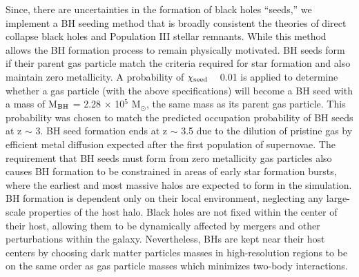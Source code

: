 \documentclass[manuscript]{aastex}
\begin{document}
Since, there are uncertainties in the formation of black holes ``seeds,'' we implement a BH seeding method that is broadly consistent the theories of direct collapse black holes \citep{Couchman1986, Abel2002, Bromm2004} and Population III stellar remnants\citep{Loeb1994, Eisenstein1995, Koushiappas2004, Begelman2006, Lodato2006}. While this method allows the BH formation process to remain physically motivated. BH seeds form if their parent gas particle match the criteria required for star formation and also maintain zero metallicity. \citep{Stinson2006} A probability of $\chi_{\rm seed}$ ~ 0.01 is applied to determine whether a gas particle (with the above specifications) will become a BH seed with a mass of M$_{\rm BH}$ = 2.28 $\times$ 10$^5$ M$_{\odot}$, the same mass as its parent gas particle. This probability was chosen to match the predicted occupation probability of BH seeds at z $\sim$ 3. \citep{Volonteri2008} 
BH seed formation ends at z $\sim$ 3.5 due to the dilution of pristine gas by efficient metal diffusion expected after the first population of supernovae. The requirement that BH seeds must form from zero metallicity gas particles also causes BH formation to be constrained in areas of early star formation bursts, where the earliest and most massive halos are expected to form in the simulation. BH formation is dependent only on their local environment, neglecting any large-scale properties of the host halo. Black holes are not fixed within the center of their host, allowing them to be dynamically affected by mergers and other perturbations within the galaxy. Nevertheless, BHs are kept near their host centers by choosing dark matter particles masses in high-resolution regions to be on the same order as gas particle masses which minimizes two-body interactions. \citep[Change citations?]{Bellovary2010,Zolotov2012}
\end{document}
